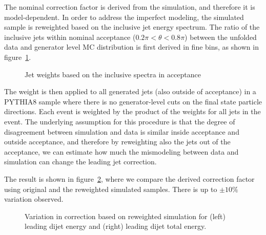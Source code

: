The nominal correction factor is derived from the simulation, and therefore it is model-dependent.  In order to address the imperfect modeling, the simulated sample is reweighted based on the inclusive jet energy spectrum.  The ratio of the inclusive jets within nominal acceptance ($0.2\pi < \theta < 0.8\pi$) between the unfolded data and generator level MC distribution is first derived in fine bins, as shown in figure~\ref{Figure:LeadingJet-CorrectionVariationWeight}.
%
\begin{figure}[htp!]
    \centering
    \caption{Jet weights based on the inclusive spectra in acceptance}
    \label{Figure:LeadingJet-CorrectionVariationWeight}
\end{figure}
%

The weight is then applied to all generated jets (also outside of acceptance) in a PYTHIA8 sample where there is no generator-level cuts on the final state particle directions.  Each event is weighted by the product of the weights for all jets in the event.  The underlying assumption for this procedure is that the degree of disagreement between simulation and data is similar inside acceptance and outside acceptance, and therefore by reweighting also the jets out of the acceptance, we can estimate how much the mismodeling between data and simulation can change the leading jet correction.

The result is shown in figure~\ref{Figure:LeadingJet-CorrectionVariation}, where we compare the derived correction factor using original and the reweighted simulated samples.  There is up to $\pm 10\%$ variation observed.

\begin{figure}[htp!]
    \centering
    \caption{Variation in correction based on reweighted simulation for (left) leading dijet energy and (right) leading dijet total energy.}
    \label{Figure:LeadingJet-CorrectionVariation}
\end{figure}


\clearpage
